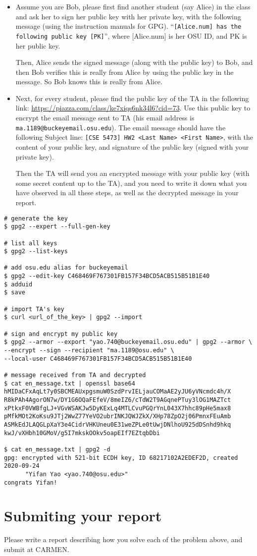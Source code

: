 \documentclass[11pt]{article}
\begin{document}
\begin{itemize}
    \item Assume you are Bob, please first find another student (say Alice) in the class and ask her to sign her public key with her private key, with the following message (using the instruction manuals for GPG). ``\texttt{[Alice.num] has the following public key [PK]}'', where [Alice.num] is her OSU ID, and PK is her public key.

Then, Alice sends the signed message (along with the public key) to Bob, and then Bob verifies this is really from Alice by using the public key in the message. So Bob knows this is really from Alice.

\item Next, for every student, please find the public key of the TA in the following link: \url{https://piazza.com/class/ke7xiqs6nk34l6?cid=73}. Use this public key to encrypt the email message sent to TA (his email address is \texttt{ma.1189@buckeyemail.osu.edu}). The email message should have the following Subject line: \texttt{[CSE 5473] HW2 <Last Name> <First Name>}, with the content of your public key, and signature of the public key (signed with your private key).

Then the TA will send you an encrypted message with your public key (with some secret content up to the TA), and you need to write it down what you have observed in all these steps, as well as the decrypted message in your report.
\end{itemize}

\begin{small}
\begin{verbatim}
# generate the key
$ gpg2 --expert --full-gen-key

# list all keys
$ gpg2 --list-keys

# add osu.edu alias for buckeyemail
$ gpg2 --edit-key C468469F767301FB157F34BCD5ACB515B51B1E40
$ adduid
$ save

# import TA's key
$ curl <url_of_the_key> | gpg2 --import

# sign and encrypt my public key
$ gpg2 --armor --export "yao.740@buckeyemail.osu.edu" | gpg2 --armor \
--encrypt --sign --recipient "ma.1189@osu.edu" \
--local-user C468469F767301FB157F34BCD5ACB515B51B1E40

# message received from TA and decrypted
$ cat en_message.txt | openssl base64
hMIDaCFxAqLt7y0SBCMEAUxpgsmuW0SzdPrvIELjauCOMaAE2yJU6yVNcmdc4h/X
R8kPAh4AgorON7w/DY1G6OQaFEfeV/8meIZ6/cTdW2T9AGqnePTuy3lOG1MAZTct
xPtkxF0VWBfgLJ+VGvWSAKJw5DyKExLq4MTLCvuPGQrYnL043X7hhc89pHe5max8
pMfkMOt2KoKsu9JTj2WwZ77YeVO2ubrINKJQWJZkX/XHp78ZpO2j06PmnxFEuAmb
ASMkEdJLAQGLpXaY3e4CidrVHKUneu0E31weZPLe0tUwjDNlhoU925dDSnhd9hkq
kwJ/vXHbh10GMoV/g5I7mkskOOkv5oapEIf7EZtqbDbi

$ cat en_message.txt | gpg2 -d
gpg: encrypted with 521-bit ECDH key, ID 68217102A2EDEF2D, created 2020-09-24
      "Yifan Yao <yao.740@osu.edu>"
congrats Yifan!
\end{verbatim}
\end{small}

\medskip

\section{Submiting your report}
Please write a report describing how you solve each of the problem above, and submit at CARMEN.
\end{document}
